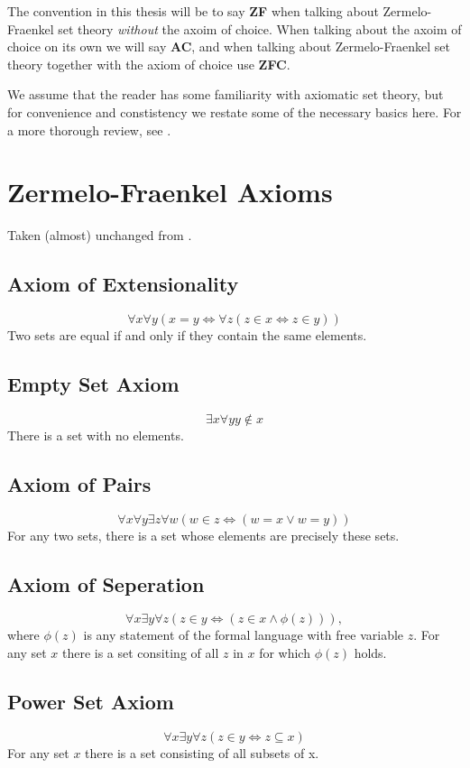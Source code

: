 \documentclass[../../main.tex]{subfiles}
\begin{document}
The convention in this thesis will be to say \textbf{ZF} when talking about Zermelo-Fraenkel set theory \textit{without} the axoim of choice.
When talking about the axoim of choice on its own we will say \textbf{AC}, and when talking about Zermelo-Fraenkel set theory together with the axiom of choice use \textbf{ZFC}.

We assume that the reader has some familiarity with axiomatic set theory, but for convenience and constistency we restate some of the necessary basics here. %
For a more thorough review, see \cite{Gol17}.

\section{Zermelo-Fraenkel Axioms}
Taken (almost) unchanged from \cite{Gol17}.

\subsection{Axiom of Extensionality}
$$\forall x \forall y \left(x = y \iff \forall z \left(z \in x \iff z \in y\right) \right)$$
Two sets are equal if and only if they contain the same elements.

\subsection{Empty Set Axiom}
$$\exists x \forall y y \notin x$$
There is a set with no elements.

\subsection{Axiom of Pairs}
$$\forall x \forall y \exists z \forall w \left( w \in z \iff \left(w = x \vee w = y \right)\right)$$
For any two sets, there is a set whose elements are precisely these sets.

\subsection{Axiom of Seperation}
$$\forall x \exists y \forall z \left(z \in y \iff \left(z \in x \wedge \phi(z)\right)\right),$$
where $\phi(z)$ is any statement of the formal language with free variable $z$.
For any set $x$ there is a set consiting of all $z$ in $x$ for which $\phi(z)$ holds.

\subsection{Power Set Axiom}
$$\forall x \exists y \forall z \left(z \in y \iff z \subseteq x\right)$$
For any set $x$ there is a set consisting of all subsets of x.
\end{document}
